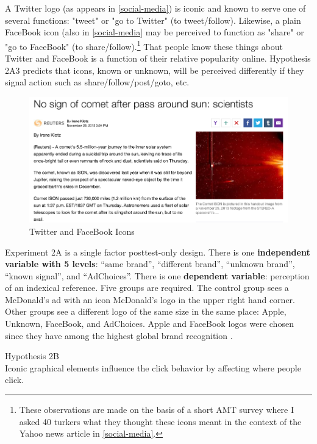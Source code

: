 A Twitter logo (as appears in \autoref{social-media}) is iconic and known to serve one of several functions: "tweet" or "go to Twitter" (to tweet/follow). Likewise, a plain FaceBook icon (also in \autoref{social-media} may be perceived to function as "share" or "go to FaceBook" (to share/follow).\footnote{These observations are made on the basis of a short AMT survey where I asked 40 turkers what they thought these icons meant in the context of the Yahoo news article in \autoref{social-media}.} That people know these things about Twitter and FaceBook is a function of their relative popularity online.  Hypothesis 2A3 predicts that icons, known or unknown, will be perceived differently if they signal action such as share/follow/post/goto, etc.

\begin{figure}
\centerline{
  \includegraphics[scale=.3]{chapter6.tex/socialmedia}
  }
\caption{Twitter and FaceBook Icons}
\label{social-media}
\end{figure}


Experiment 2A is a single factor posttest-only design. There is one \textbf{independent variable with 5 levels}: ``same brand'', ``different brand'', ``unknown brand'', ``known signal'', and ``AdChoices''. There is one \textbf{dependent variable}: perception of an indexical reference. Five groups are required. The control group sees a McDonald's ad with an icon McDonald's logo in the upper right hand corner. Other groups see a different logo of the same size in the same place: Apple, Unknown, FaceBook, and AdChoices. Apple and FaceBook logos were chosen since they have among the highest global brand recognition  \citep{Interbrand:aa}. 
 
\begin{description}
\item{Hypothesis 2B} \hfill \\
Iconic graphical elements influence the click behavior by affecting where people click.
\end{description}

